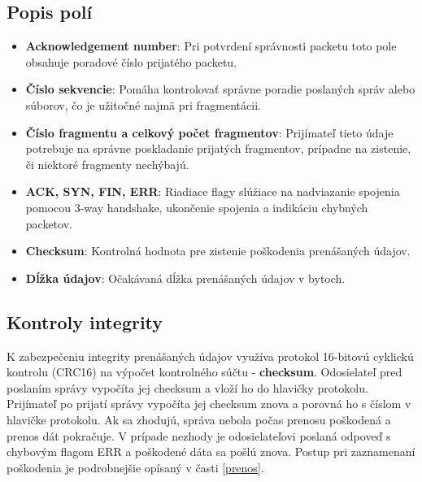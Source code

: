 \documentclass[a4paper,12pt]{article}
\begin{document}
    \subsection{Popis polí}
    \begin{itemize}
	\item \textbf{Acknowledgement number}: Pri potvrdení správnosti packetu toto pole obsahuje poradové číslo prijatého packetu.
        \item \textbf{Číslo sekvencie}: Pomáha kontrolovať správne poradie poslaných správ alebo súborov, čo je užitočné najmä pri fragmentácii.
        \item \textbf{Číslo fragmentu a celkový počet fragmentov}: Prijímateľ tieto údaje potrebuje na správne poskladanie prijatých fragmentov, prípadne na zistenie, či niektoré fragmenty nechýbajú.
        \item \textbf{ACK, SYN, FIN, ERR}: Riadiace flagy slúžiace na nadviazanie spojenia pomocou 3-way handshake, ukončenie spojenia a indikáciu chybných packetov.
        \item \textbf{Checksum}: Kontrolná hodnota pre zistenie poškodenia prenášaných údajov.
        \item \textbf{Dĺžka údajov}: Očakávaná dĺžka prenášaných údajov v bytoch.
    \end{itemize}

    \subsection{Kontroly integrity}\label{crc}
    K zabezpečeniu integrity prenášaných údajov využíva protokol 16-bitovú cyklickú kontrolu (CRC16) na výpočet kontrolného súčtu - \textbf{checksum}. Odosielateľ pred poslaním správy vypočíta jej checksum a vloží ho do hlavičky protokolu. Prijímateľ po prijatí správy vypočíta jej checksum znova a porovná ho s číslom v hlavičke protokolu. Ak sa zhodujú, správa nebola počas prenosu poškodená a prenos dát pokračuje. V prípade nezhody je odosielateľovi poslaná odpoveď s chybovým flagom ERR a poškodené dáta sa pošlú znova. Postup pri zaznamenaní poškodenia je podrobnejšie opísaný v časti \ref{prenos}.
\end{document}
